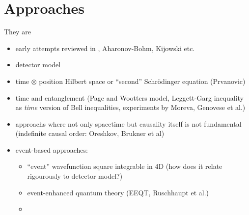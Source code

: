 \section{Approaches}

They are

\begin{itemize}
\item early attempts reviewed in \parencite{TQM1, TQM2}, Aharonov-Bohm, Kijowski etc.
\item detector model \parencite{TQM1, TQM2}
\item
    time $\otimes$ position Hilbert space or ``second'' Schr\"odinger equation (Prvanovic)
\item time and entanglement (Page and Wootters model, Leggett-Garg inequality as \emph{time} version of Bell inequalities, experiments by Moreva, Genovese et al.)
\item approachs where not only spacetime but causality itself is not fundamental (indefinite causal order: Oreshkov, Brukner et al)
\item event-based approaches: 
    \begin{itemize}
        \item ``event'' wavefunction square integrable in 4D (how does it relate rigourously to detector model?)
        \item event-enhanced quantum theory (EEQT, Ruschhaupt et al.)
        \item 
    \end{itemize}
\end{itemize}